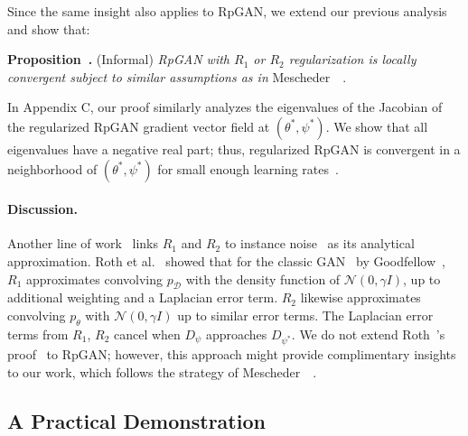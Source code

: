 Since the same insight also applies to RpGAN, 
we extend our previous analysis and show that:

\vspace{1ex}
\noindent \textbf{Proposition~.} (Informal) \emph{RpGAN with $R_1$ or $R_2$ regularization is locally convergent subject to similar assumptions as in} Mescheder~\etal~\cite{r1}.
\vspace{1ex}

In Appendix C, our proof similarly analyzes the eigenvalues of the Jacobian of the regularized RpGAN gradient vector field at $(\theta^*,\psi^*)$. We show that all eigenvalues have a negative real part; thus, regularized RpGAN is convergent in a neighborhood of $(\theta^*,\psi^*)$ for small enough learning rates~\cite{r1}.

\paragraph{Discussion.}
Another line of work~\cite{r1r2} links $R_1$ and $R_2$ to instance noise~\cite{instancenoise} as its analytical approximation. Roth et al.~\cite{r1r2} showed that for the classic GAN~\cite{gan} by Goodfellow~\etal, $R_1$ approximates convolving $p_\mathcal{D}$ with the density function of $\mathcal{N}(0, \gamma I)$, up to additional weighting and a Laplacian error term. $R_2$ likewise approximates convolving $p_\theta$ with $\mathcal{N}(0, \gamma I)$ up to similar error terms. The Laplacian error terms from $R_1$, $R_2$ cancel when $D_\psi$ approaches $D_{\psi^*}$. We do not extend Roth~\etal's proof~\cite{r1r2} to RpGAN; however, this approach might provide complimentary insights to our work, which follows the strategy of Mescheder~\etal~\cite{r1}.

\subsection{A Practical Demonstration}


